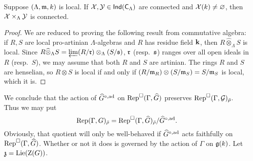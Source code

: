 \begin{theorem}
Suppose $(\Lambda,\mathfrak{m},k)$ is local. If $\mathcal{X},\mathcal{Y}\in \operatorname{\mathsf{Ind}}(\mathsf{C}_\Lambda)$ are 
connected and $\mathcal{X}(k)\ne\varnothing$, then $\mathcal{X}\times_\Lambda \mathcal{Y}$ is 
connected. 
\end{theorem}
\begin{proof}
We are reduced to proving the following result from commutative algebra: if 
$R,S$ are local pro-artinian $\Lambda$-algebras and $R$ has residue field 
$\mathbf{k}$, then $R\widehat\otimes_\Lambda S$ is local. Since 
$R\widehat\otimes_\Lambda S = \varprojlim (R/\mathfrak{r})\otimes_\Lambda (S/\mathfrak{s})$, 
$\mathfrak{r}$ (resp.~$\mathfrak{s}$) ranges over all open ideals in $R$ (resp.~$S$), we may 
assume that both $R$ and $S$ are artinian. The rings $R$ and $S$ are 
henselian, so $R\otimes S$ is local if and only if 
$(R/\mathfrak{m}_R)\otimes (S/\mathfrak{m}_S) = S/\mathfrak{m}_S$ is local, which it is. 
\end{proof}

We conclude that the action of $\widehat G^{\circ,\mathrm{ad}}$ on 
$\operatorname{Rep}^\square(\Gamma,\widehat G)$ 
preserves $\operatorname{Rep}^\square(\Gamma,\mathcal{G})_{\bar\rho}$. Thus we may put 
\[
	\operatorname{Rep}(\Gamma,G)_{\bar\rho} = \operatorname{Rep}^\square(\Gamma,\widehat G)_{\bar\rho} / \widehat G^{\circ,\mathrm{ad}} .
\]
Obviously, that quotient will only be well-behaved if $\widehat G^{\circ,\mathrm{ad}}$ 
acts faithfully on $\operatorname{Rep}^\square(\Gamma,\widehat G)$. Whether or not it does 
is governed by the action of $\Gamma$ on $\mathfrak{g}(k)$. Let 
$\mathfrak{z} = \operatorname{Lie}(\operatorname{Z}(G))$. 

